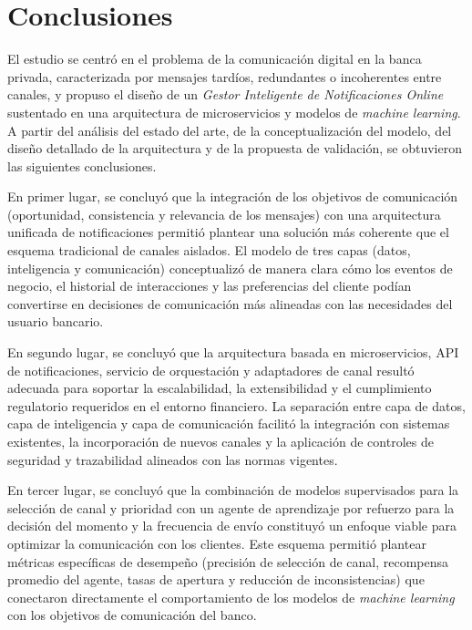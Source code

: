 \documentclass[conference]{IEEEtran}
\begin{document}
\section{Conclusiones}

El estudio se centr{\'o} en el problema de la comunicaci{\'o}n digital en la banca privada, caracterizada por mensajes tard{\'i}os, redundantes o incoherentes entre canales, y propuso el dise{\~n}o de un \textit{Gestor Inteligente de Notificaciones Online} sustentado en una arquitectura de microservicios y modelos de \textit{machine learning}. A partir del an{\'a}lisis del estado del arte, de la conceptualizaci{\'o}n del modelo, del dise{\~n}o detallado de la arquitectura y de la propuesta de validaci{\'o}n, se obtuvieron las siguientes conclusiones.

En primer lugar, se concluy{\'o} que la integraci{\'o}n de los objetivos de comunicaci{\'o}n (oportunidad, consistencia y relevancia de los mensajes) con una arquitectura unificada de notificaciones permiti{\'o} plantear una soluci{\'o}n m{\'a}s coherente que el esquema tradicional de canales aislados. El modelo de tres capas (datos, inteligencia y comunicaci{\'o}n) conceptualiz{\'o} de manera clara c{\'o}mo los eventos de negocio, el historial de interacciones y las preferencias del cliente pod{\'i}an convertirse en decisiones de comunicaci{\'o}n m{\'a}s alineadas con las necesidades del usuario bancario.

En segundo lugar, se concluy{\'o} que la arquitectura basada en microservicios, API de notificaciones, servicio de orquestaci{\'o}n y adaptadores de canal result{\'o} adecuada para soportar la escalabilidad, la extensibilidad y el cumplimiento regulatorio requeridos en el entorno financiero. La separaci{\'o}n entre capa de datos, capa de inteligencia y capa de comunicaci{\'o}n facilit{\'o} la integraci{\'o}n con sistemas existentes, la incorporaci{\'o}n de nuevos canales y la aplicaci{\'o}n de controles de seguridad y trazabilidad alineados con las normas vigentes.

En tercer lugar, se concluy{\'o} que la combinaci{\'o}n de modelos supervisados para la selecci{\'o}n de canal y prioridad con un agente de aprendizaje por refuerzo para la decisi{\'o}n del momento y la frecuencia de env{\'i}o constituy{\'o} un enfoque viable para optimizar la comunicaci{\'o}n con los clientes. Este esquema permiti{\'o} plantear m{\'e}tricas espec{\'i}ficas de desempe{\~n}o (precisi{\'o}n de selecci{\'o}n de canal, recompensa promedio del agente, tasas de apertura y reducci{\'o}n de inconsistencias) que conectaron directamente el comportamiento de los modelos de \textit{machine learning} con los objetivos de comunicaci{\'o}n del banco.
\end{document}
